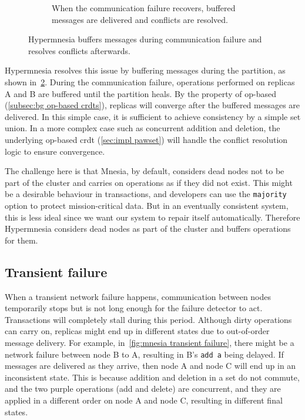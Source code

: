\begin{figure}[htp]
\begin{subfigure}[t]{0.9\columnwidth}
    \caption{When the communication failure recovers, buffered messages are delivered
    and conflicts are resolved.}
    \label{fig:hypermnesia comm failure}
  \end{subfigure}
  \caption{Hypermnesia buffers messages during communication failure and resolves
  conflicts afterwards.}
\end{figure}


Hypermnesia resolves this issue by buffering messages during the partition, as
shown in~\cref{fig:hypermnesia comm failure}. During the communication failure, 
operations performed on replicas A and B are buffered until the partition heals. 
By the property of op-based  (\cref{subsec:bg op-based crdts}),
replicas will converge after the buffered messages are delivered.
In this simple case, it is sufficient to achieve consistency by a simple set 
union. In a more complex case
such as concurrent addition and deletion, the underlying op-based 
\acrshort{crdt} (\cref{sec:impl pawset}) will handle the conflict resolution 
logic to ensure convergence.

The challenge here is that Mnesia, by default, considers dead nodes not to be 
part of the
cluster and carries on operations as if they did not exist. This might be a
desirable behaviour in transactions, and developers can use the \texttt{majority}
option to protect mission-critical data. But in an eventually consistent system,
this is less ideal since we want our system to repair itself automatically.
Therefore Hypermnesia considers dead nodes as part of the cluster and buffers
operations for them.

\subsection{Transient failure} \label{subsec:impl transient failure}

When a transient network failure happens, communication between nodes temporarily
stops but is not long enough for the failure detector to act. Transactions
will completely stall during this period. Although dirty operations can carry
on, replicas might end up in different states due to out-of-order message delivery.
For example, in~\cref{fig:mnesia transient failure}, there might be a
network failure between node B to A, resulting in B's \texttt{add a} being delayed.
If messages are delivered as they arrive, then node A and node C will end up in 
an inconsistent state. This is because addition and deletion in a set 
do not commute, and the two purple operations (add and delete) are concurrent, and
they are applied in a different order on node A and node C, resulting in different final
states.

